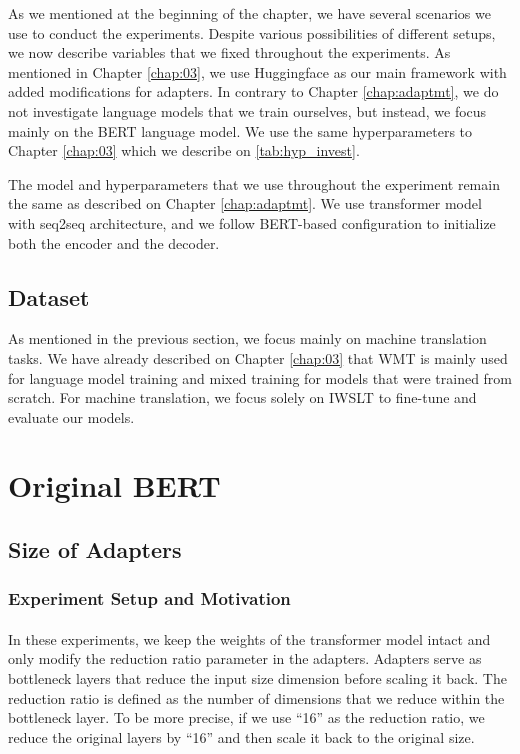 As we mentioned at the beginning of the chapter, we have several scenarios we use to conduct the experiments. Despite various possibilities of different setups, we now describe variables that we fixed throughout the experiments. As mentioned in Chapter \cref{chap:03}, we use Huggingface as our main framework with added modifications for adapters. In contrary to Chapter \ref{chap:adaptmt}, we do not investigate language models that we train ourselves, but instead, we focus mainly on the BERT language model. We use the same hyperparameters to Chapter \ref{chap:03} which we describe on \cref{tab:hyp_invest}.

The model and hyperparameters that we use throughout the experiment remain the same as described on Chapter \ref{chap:adaptmt}. We use transformer model with seq2seq architecture, and we follow BERT-based configuration to initialize both the encoder and the decoder.

\subsection{Dataset}
As mentioned in the previous section, we focus mainly on machine translation tasks. We have already described on Chapter \ref{chap:03} that WMT is mainly used for language model training and mixed training for models that were trained from scratch. For machine translation, we focus solely on IWSLT to fine-tune and evaluate our models.

\section{Original BERT}
\subsection{Size of Adapters}
\subsubsection{Experiment Setup and Motivation}
\paragraph{}
In these experiments, we keep the weights of the transformer model intact and only modify the reduction ratio parameter in the adapters. Adapters serve as bottleneck layers that reduce the input size dimension before scaling it back. The reduction ratio is defined as the number of dimensions that we reduce within the bottleneck layer. To be more precise, if we use ``16'' as the reduction ratio, we reduce the original layers by ``16'' and then scale it back to the original size.

